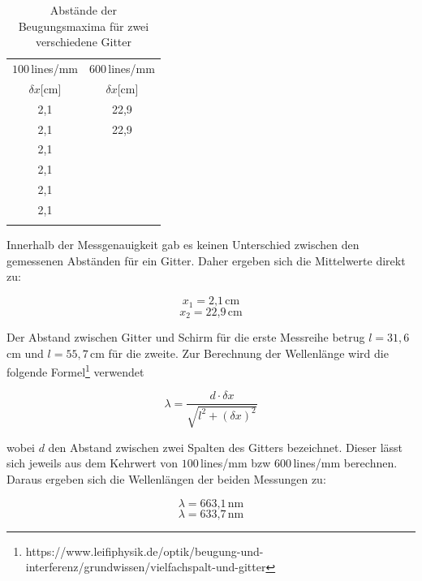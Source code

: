 \begin{table}
\centering
\caption{Abstände der Beugungsmaxima für zwei verschiedene Gitter}
\begin{tabular}{c c}
\toprule
$100\,$lines/mm&$600\,$lines/mm\\
$\delta x$[cm]&$\delta x$[cm]\\
\midrule
2,1	&	22,9	\\
2,1	&	22,9	\\
2,1	&		\\
2,1	&		\\
2,1	&		\\
2,1	&		\\
\bottomrule
\label{tab:WellenAbstand}
\end{tabular}
\end{table}

Innerhalb der Messgenauigkeit gab es keinen Unterschied zwischen den gemessenen Abständen für ein Gitter. Daher ergeben sich die Mittelwerte direkt zu:

\begin{equation}
x_1 = \text{2,1}\,\text{cm}
\end{equation}
\begin{equation}
x_2 = \text{22,9}\,\text{cm}
\end{equation}


Der Abstand zwischen Gitter und Schirm für die erste Messreihe betrug $l = 31,6$\,cm und $l = 55,7$\,cm für die zweite. Zur Berechnung der Wellenlänge wird die folgende Formel\footnote{https://www.leifiphysik.de/optik/beugung-und-interferenz/grundwissen/vielfachspalt-und-gitter} verwendet

\begin{equation}
\lambda = \frac{d\cdot \delta x}{\sqrt{l^{2} +  (\delta x)^{2}}}
\end{equation}

 wobei $d$ den Abstand zwischen zwei Spalten des Gitters bezeichnet. Dieser lässt sich jeweils aus dem Kehrwert von $100$\,lines/mm bzw $600$\,lines/mm berechnen. Daraus ergeben sich die Wellenlängen der beiden Messungen zu:

\begin{equation}
\lambda = \text{663,1}\,\text{nm}
\end{equation}
\begin{equation}
\lambda = \text{633,7}\,\text{nm}
\end{equation}


\clearpage




































